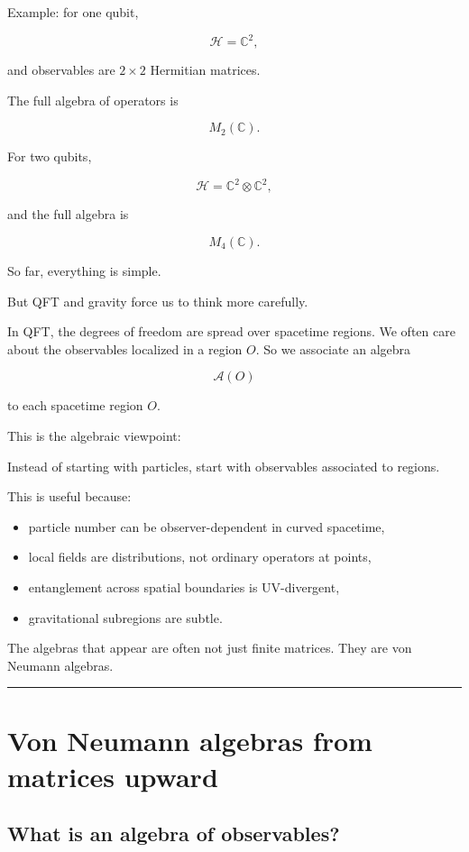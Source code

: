\documentclass[11pt,a4paper]{article}
\newenvironment{qiqtquote}{\begin{mdframed}[style=quotestyle]}{\end{mdframed}}
\begin{document}
Example: for one qubit,

\[
\mathcal{H}=\mathbb{C}^2,
\]

and observables are $2\times 2$ Hermitian matrices.

The full algebra of operators is

\[
M_2(\mathbb{C}).
\]

For two qubits,

\[
\mathcal{H}=\mathbb{C}^2\otimes \mathbb{C}^2,
\]

and the full algebra is

\[
M_4(\mathbb{C}).
\]

So far, everything is simple.

But QFT and gravity force us to think more carefully.

In QFT, the degrees of freedom are spread over spacetime regions. We often care about the observables localized in a region $O$. So we associate an algebra

\[
\mathcal{A}(O)
\]

to each spacetime region $O$.

This is the algebraic viewpoint:

\begin{qiqtquote}
Instead of starting with particles, start with observables associated to regions.
\end{qiqtquote}

This is useful because:

\begin{itemize}
  \item particle number can be observer-dependent in curved spacetime,
  \item local fields are distributions, not ordinary operators at points,
  \item entanglement across spatial boundaries is UV-divergent,
  \item gravitational subregions are subtle.
\end{itemize}

The algebras that appear are often not just finite matrices. They are von Neumann algebras.

\medskip\hrule\medskip

\section{Von Neumann algebras from matrices upward}

\subsection{What is an algebra of observables?}
\end{document}
